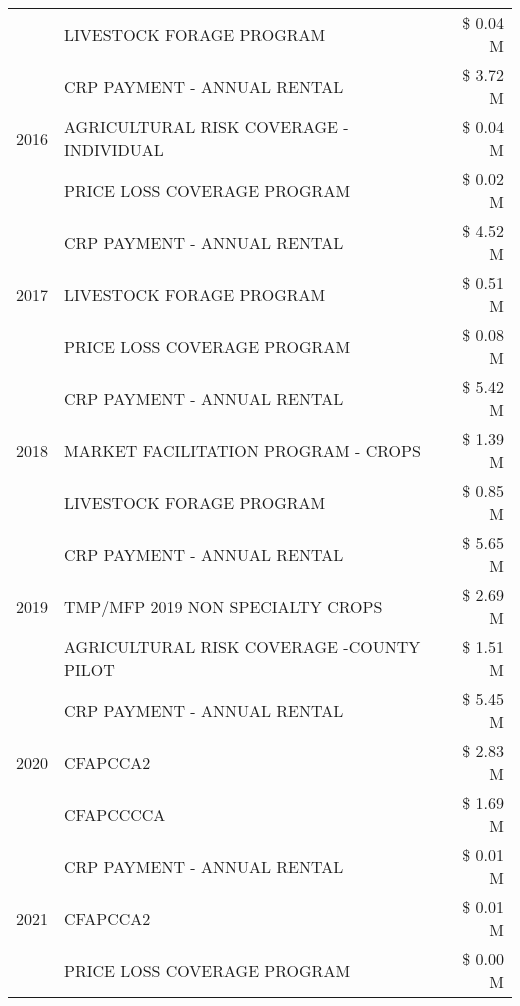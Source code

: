 \begin{tabular}{llr}
 & LIVESTOCK FORAGE PROGRAM & \$ 0.04 M \\
\cline{1-3}
\multirow[t]{3}{*}{2016} & CRP PAYMENT - ANNUAL RENTAL & \$ 3.72 M \\
 & AGRICULTURAL RISK COVERAGE - INDIVIDUAL & \$ 0.04 M \\
 & PRICE LOSS COVERAGE PROGRAM & \$ 0.02 M \\
\cline{1-3}
\multirow[t]{3}{*}{2017} & CRP PAYMENT - ANNUAL RENTAL & \$ 4.52 M \\
 & LIVESTOCK FORAGE PROGRAM & \$ 0.51 M \\
 & PRICE LOSS COVERAGE PROGRAM & \$ 0.08 M \\
\cline{1-3}
\multirow[t]{3}{*}{2018} & CRP PAYMENT - ANNUAL RENTAL & \$ 5.42 M \\
 & MARKET FACILITATION PROGRAM - CROPS & \$ 1.39 M \\
 & LIVESTOCK FORAGE PROGRAM & \$ 0.85 M \\
\cline{1-3}
\multirow[t]{3}{*}{2019} & CRP PAYMENT - ANNUAL RENTAL & \$ 5.65 M \\
 & TMP/MFP 2019 NON SPECIALTY CROPS & \$ 2.69 M \\
 & AGRICULTURAL RISK COVERAGE -COUNTY PILOT & \$ 1.51 M \\
\cline{1-3}
\multirow[t]{3}{*}{2020} & CRP PAYMENT - ANNUAL RENTAL & \$ 5.45 M \\
 & CFAPCCA2 & \$ 2.83 M \\
 & CFAPCCCCA & \$ 1.69 M \\
\cline{1-3}
\multirow[t]{3}{*}{2021} & CRP PAYMENT - ANNUAL RENTAL & \$ 0.01 M \\
 & CFAPCCA2 & \$ 0.01 M \\
 & PRICE LOSS COVERAGE PROGRAM & \$ 0.00 M \\
\cline{1-3}
\bottomrule
\end{tabular}
